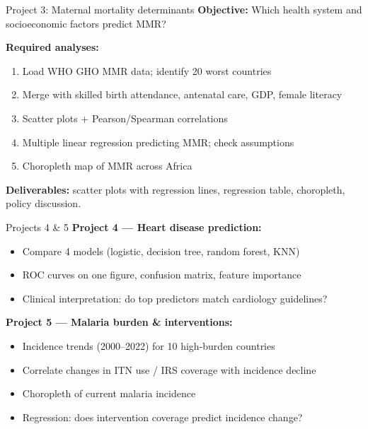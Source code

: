 \documentclass[aspectratio=169,11pt]{beamer}
\begin{document}
\begin{frame}{Project 3: Maternal mortality determinants}
\textbf{Objective:} Which health system and socioeconomic factors predict MMR?

\vspace{4pt}
\textbf{Required analyses:}
\begin{enumerate}
  \item Load WHO GHO MMR data; identify 20 worst countries
  \item Merge with skilled birth attendance, antenatal care, GDP, female literacy
  \item Scatter plots + Pearson/Spearman correlations
  \item Multiple linear regression predicting MMR; check assumptions
  \item Choropleth map of MMR across Africa
\end{enumerate}

\textbf{Deliverables:} scatter plots with regression lines, regression table, choropleth, policy discussion.
\end{frame}

\begin{frame}{Projects 4 \& 5}
\textbf{Project 4 --- Heart disease prediction:}
\begin{itemize}
  \item Compare 4 models (logistic, decision tree, random forest, KNN)
  \item ROC curves on one figure, confusion matrix, feature importance
  \item Clinical interpretation: do top predictors match cardiology guidelines?
\end{itemize}

\vspace{8pt}
\textbf{Project 5 --- Malaria burden \& interventions:}
\begin{itemize}
  \item Incidence trends (2000--2022) for 10 high-burden countries
  \item Correlate changes in ITN use / IRS coverage with incidence decline
  \item Choropleth of current malaria incidence
  \item Regression: does intervention coverage predict incidence change?
\end{itemize}
\end{frame}
\end{document}
